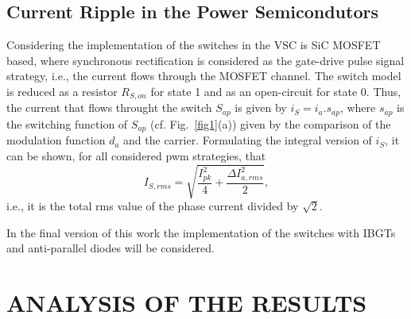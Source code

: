 \documentclass[10pt, onecolumn,conference]{IEEEtran}
\begin{document}
\subsection{Current Ripple in the Power Semicondutors}

Considering the implementation of the switches in the VSC is SiC MOSFET based, where synchronous rectification is considered as the gate-drive pulse signal strategy, i.e., the current flows through the MOSFET channel. The switch model is reduced as a resistor $R_{S,on}$ for state 1 and as an open-circuit for state 0. Thus, the current that flows throught the switch $S_{ap}$ is given by $i_S\!=\!i_a. s_{ap}$, where $s_{ap}$ is the switching function of $S_{ap}$ (cf. Fig.~\ref{fig1}(a)) given by the comparison of the modulation function $d_a$ and the carrier. Formulating the integral version of $i_S$, it can be shown, for all considered pwm strategies, that
%
\begin{equation}
I_{S,rms}=\sqrt{\dfrac{I_{pk}^2}{4}+\dfrac{\Delta I_{a,rms}^2}{{2}}},
\end{equation} i.e., it is the total rms value of the phase current divided by $\sqrt{2}$. 

In the final version of this work the implementation of the switches with IBGTs and anti-parallel diodes will be considered.



\section{{\MakeUppercase{Analysis of the Results}}}
\end{document}
